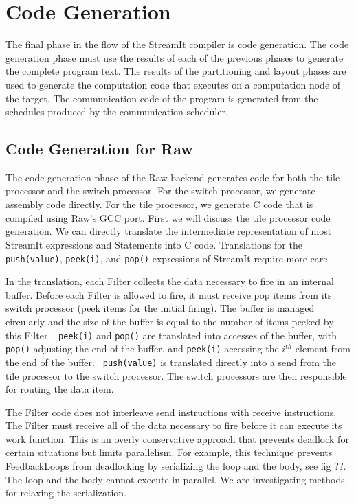 \section{Code Generation}
\label{sec:codegen}

The final phase in the flow of the StreamIt compiler is code
generation.  The code generation phase must use the results of each of
the previous phases to generate the complete program text.  The
results of the partitioning and layout phases are used to generate the
computation code that executes on a computation node of the target.
The communication code of the program is generated from the schedules
produced by the communication scheduler.


\subsection{Code Generation for Raw}

The code generation phase of the Raw backend generates code for both
the tile processor and the switch processor.  For the switch
processor, we generate assembly code directly.  For the tile
processor, we generate C code that is compiled using Raw's GCC port.
First we will discuss the tile processor code generation.  We can
directly translate the intermediate representation of most StreamIt
expressions and Statements into C code.  Translations for the {\tt
push(value)}, {\tt peek(i)}, and {\tt pop()} expressions of StreamIt
require more care.


In the translation, each Filter collects the data necessary to fire in
an internal buffer.  Before each Filter is allowed to fire, it must
receive pop items from its switch processor (peek items for the
initial firing).  The buffer is managed circularly and the size of the
buffer is equal to the number of items peeked by this Filter.  {\tt
peek(i)} and {\tt pop()} are translated into accesses of the buffer,
with {\tt pop()} adjusting the end of the buffer, and {\tt peek(i)}
accessing the $i^{th}$ element from the end of the buffer.  {\tt
push(value)} is translated directly into a send from the tile
processor to the switch processor.  The switch processors are then
responsible for routing the data item.

The Filter code does not interleave send instructions with receive
instructions.  The Filter must receive all of the data necessary to
fire before it can execute its work function.  This is an overly
conservative approach that prevents deadlock for certain situations
but limits parallelism.  For example, this technique prevents
FeedbackLoops from deadlocking by serializing the loop and the body,
see fig ??.  The loop and the body cannot execute in parallel.  We are
investigating methods for relaxing the serialization.

